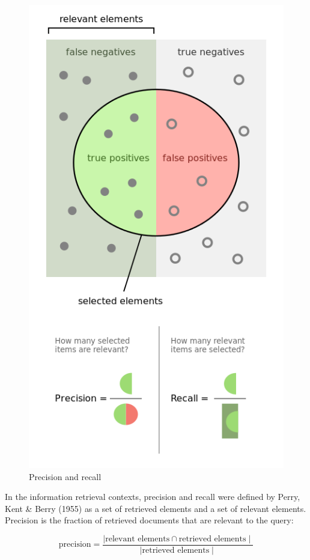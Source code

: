 \begin{figure}
\includegraphics[scale=0.35]{Images/Precisionrecall.png}
\centering
\caption{Precision and recall \citep{wiki2018precision_recall}}
\label{img:precision_and_recall}
\end{figure}


In the information retrieval contexts, precision and recall were defined by Perry, Kent \& Berry (1955) \citep{perry1955machine} as a set of retrieved elements and a set of relevant elements. Precision is the fraction of retrieved documents that are relevant to the query:


\begin{equation}
\text{precision} = \dfrac{ \mid {\text{relevant elements}} \cap {\text{retrieved elements}} \mid }{ \mid {\text{retrieved elements}} \mid }
\end{equation}


